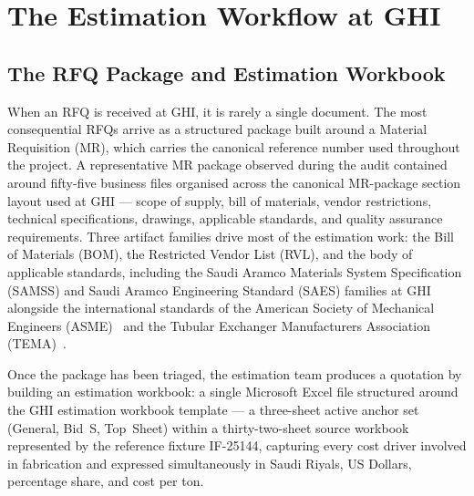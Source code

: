 \section{The Estimation Workflow at GHI}
\subsection{The RFQ Package and Estimation Workbook}
When an RFQ is received at GHI, it is rarely a single document. The most consequential RFQs arrive as a structured package built around a Material Requisition (MR), which carries the canonical reference number used throughout the project. A representative MR package observed during the audit contained around fifty-five business files organised across the canonical MR-package section layout used at GHI --- scope of supply, bill of materials, vendor restrictions, technical specifications, drawings, applicable standards, and quality assurance requirements. Three artifact families drive most of the estimation work: the Bill of Materials (BOM), the Restricted Vendor List (RVL), and the body of applicable standards, including the Saudi Aramco Materials System Specification (SAMSS) and Saudi Aramco Engineering Standard (SAES) families at GHI alongside the international standards of the American Society of Mechanical Engineers (ASME)~\cite{asme_bpvc_viii_div1_2025} and the Tubular Exchanger Manufacturers Association (TEMA)~\cite{tema_standards_11ed}.

Once the package has been triaged, the estimation team produces a quotation by building an estimation workbook: a single Microsoft Excel file structured around the GHI estimation workbook template --- a three-sheet active anchor set (General, Bid~S, Top~Sheet) within a thirty-two-sheet source workbook represented by the reference fixture IF-25144, capturing every cost driver involved in fabrication and expressed simultaneously in Saudi Riyals, US Dollars, percentage share, and cost per ton.

